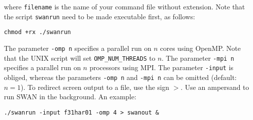 \documentclass[12pt]{book}
\begin{document}
where {\tt filename} is the name of your command file without extension. Note that the script
{\tt swanrun} need to be made executable first, as follows:
\begin{verbatim}
chmod +rx ./swanrun
\end{verbatim}
The parameter {\tt -omp~n}
specifies a parallel run on $n$ cores using OpenMP. Note that the UNIX script will set
{\small \tt OMP\_NUM\_THREADS} to $n$. The parameter {\tt -mpi~n} specifies a
parallel run on $n$ processors using MPI. The parameter {\tt -input} is obliged, whereas the
parameters {\tt -omp~n} and {\tt -mpi~n} can be omitted (default: $n=1$). To redirect screen
output to a file, use the sign $>$. Use an ampersand to run SWAN in the background. An
example:
\begin{verbatim}
./swanrun -input f31har01 -omp 4 > swanout &
\end{verbatim}
\end{document}
